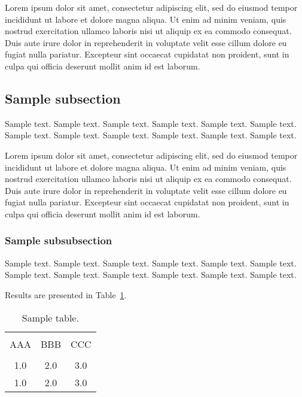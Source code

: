 \documentclass[jou,apacite]{apa6}
\begin{document}
  Lorem ipsum dolor sit amet, consectetur adipiscing elit, sed do eiusmod tempor incididunt ut labore et dolore magna aliqua. Ut enim ad minim veniam, quis nostrud exercitation ullamco laboris nisi ut aliquip ex ea commodo consequat. Duis aute irure dolor in reprehenderit in voluptate velit esse cillum dolore eu fugiat nulla pariatur. Excepteur sint occaecat cupidatat non proident, sunt in culpa qui officia deserunt mollit anim id est laborum.

  \subsection{Sample subsection}
  Sample text. Sample text. Sample text. Sample text. Sample text. Sample text. 
  Sample text. Sample text. Sample text. Sample text. Sample text. Sample text. 

  Lorem ipsum dolor sit amet, consectetur adipiscing elit, sed do eiusmod tempor incididunt ut labore et dolore magna aliqua. Ut enim ad minim veniam, quis nostrud exercitation ullamco laboris nisi ut aliquip ex ea commodo consequat. Duis aute irure dolor in reprehenderit in voluptate velit esse cillum dolore eu fugiat nulla pariatur. Excepteur sint occaecat cupidatat non proident, sunt in culpa qui officia deserunt mollit anim id est laborum.

  \subsubsection{Sample subsubsection}
  Sample text. Sample text. Sample text. Sample text. Sample text. Sample text. 
  Sample text. Sample text. Sample text. Sample text. Sample text. Sample text. 


  Results are presented in Table~\ref{tab1}.
  \begin{table}[!htb]
    \caption{Sample table.}\label{tab1}
    \begin{tabular}{ccc}
      \hline\\[-1.5ex]
      AAA & BBB & CCC \\[0.5ex]
      \hline\\[-1.5ex]
      1.0 & 2.0 & 3.0\\[0.5ex]
      1.0 & 2.0 & 3.0\\[0.5ex]
      \hline
    \end{tabular}
  \end{table}


  
\end{document}
